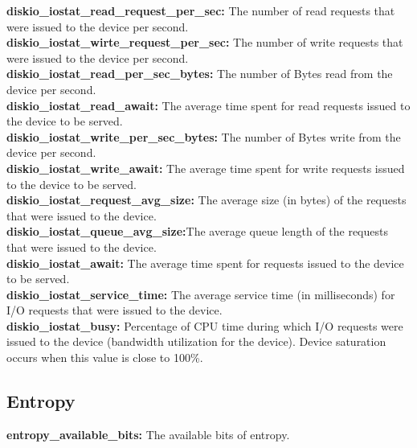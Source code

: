 \documentclass{iosart2c}
\begin{document}
\textbf{diskio\_iostat\_read\_request\_per\_sec:} The number of read requests that were issued to the device per second.\\

\textbf{diskio\_iostat\_wirte\_request\_per\_sec:} The number of write requests that were issued to the device per second.\\

\textbf{diskio\_iostat\_read\_per\_sec\_bytes:} The number of Bytes read from the device per second.\\

\textbf{diskio\_iostat\_read\_await:} The average time spent for read requests issued to the device to be served.\\

\textbf{diskio\_iostat\_write\_per\_sec\_bytes:}  The number of Bytes write from the device per second.\\

\textbf{diskio\_iostat\_write\_await:} The average time spent for write requests issued to the device to be served.\\

\textbf{diskio\_iostat\_request\_avg\_size:} The average size (in bytes) of the requests that were issued to the device.\\

\textbf{diskio\_iostat\_queue\_avg\_size:}The average queue length of the requests that were issued to the device.\\

\textbf{diskio\_iostat\_await:} The average time spent for requests issued to the device to be served.\\

\textbf{diskio\_iostat\_service\_time:} The average service time (in milliseconds) for I/O requests that were issued to the device.\\

\textbf{diskio\_iostat\_busy:} Percentage of CPU time during which I/O requests were issued to the device (bandwidth utilization for the device). Device saturation occurs when this value is close to 100\%.\\


\subsection{Entropy}

\textbf{entropy\_available\_bits:} The available bits of entropy.\\
\end{document}
